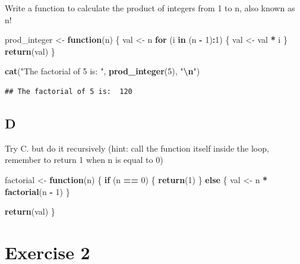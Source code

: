 \documentclass[
]{article}
\newenvironment{Shaded}{\begin{snugshade}}{\end{snugshade}}
\newcommand{\ControlFlowTok}[1]{\textcolor[rgb]{0.13,0.29,0.53}{\textbf{#1}}}
\newcommand{\DecValTok}[1]{\textcolor[rgb]{0.00,0.00,0.81}{#1}}
\newcommand{\FunctionTok}[1]{\textcolor[rgb]{0.13,0.29,0.53}{\textbf{#1}}}
\newcommand{\NormalTok}[1]{#1}
\newcommand{\OtherTok}[1]{\textcolor[rgb]{0.56,0.35,0.01}{#1}}
\newcommand{\SpecialCharTok}[1]{\textcolor[rgb]{0.81,0.36,0.00}{\textbf{#1}}}
\newcommand{\StringTok}[1]{\textcolor[rgb]{0.31,0.60,0.02}{#1}}
\begin{document}
Write a function to calculate the product of integers from 1 to n, also
known as n!

\begin{Shaded}
\begin{Highlighting}[]
\NormalTok{prod\_integer }\OtherTok{\textless{}{-}} \ControlFlowTok{function}\NormalTok{(n) \{}
\NormalTok{  val }\OtherTok{\textless{}{-}}\NormalTok{ n}
  \ControlFlowTok{for}\NormalTok{ (i }\ControlFlowTok{in}\NormalTok{ (n }\SpecialCharTok{{-}} \DecValTok{1}\NormalTok{)}\SpecialCharTok{:}\DecValTok{1}\NormalTok{) \{}
\NormalTok{    val }\OtherTok{\textless{}{-}}\NormalTok{ val }\SpecialCharTok{*}\NormalTok{ i}
\NormalTok{  \}}
  \FunctionTok{return}\NormalTok{(val)}
\NormalTok{\}}

\FunctionTok{cat}\NormalTok{(}\StringTok{"The factorial of 5 is: "}\NormalTok{, }\FunctionTok{prod\_integer}\NormalTok{(}\DecValTok{5}\NormalTok{), }\StringTok{"}\SpecialCharTok{\textbackslash{}n}\StringTok{"}\NormalTok{)}
\end{Highlighting}
\end{Shaded}

\begin{verbatim}
## The factorial of 5 is:  120
\end{verbatim}

\hypertarget{d}{%
\subsection{D}\label{d}}

Try C. but do it recursively (hint: call the function itself inside the
loop, remember to return 1 when n is equal to 0)

\begin{Shaded}
\begin{Highlighting}[]
\NormalTok{factorial }\OtherTok{\textless{}{-}} \ControlFlowTok{function}\NormalTok{(n) \{}
  \ControlFlowTok{if}\NormalTok{ (n }\SpecialCharTok{==} \DecValTok{0}\NormalTok{) \{}
    \FunctionTok{return}\NormalTok{(}\DecValTok{1}\NormalTok{)}
\NormalTok{  \} }\ControlFlowTok{else}\NormalTok{ \{}
\NormalTok{    val }\OtherTok{\textless{}{-}}\NormalTok{ n }\SpecialCharTok{*} \FunctionTok{factorial}\NormalTok{(n }\SpecialCharTok{{-}} \DecValTok{1}\NormalTok{)}
\NormalTok{  \}}

  \FunctionTok{return}\NormalTok{(val)}
\NormalTok{\}}
\end{Highlighting}
\end{Shaded}

\hypertarget{exercise-2}{%
\section{Exercise 2}\label{exercise-2}}
\end{document}
